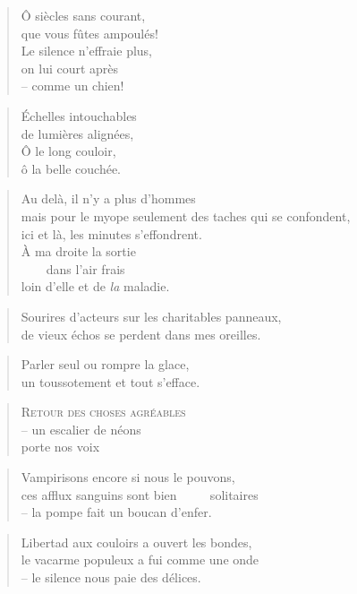   \begin{verse}
    Ô siècles sans courant,\\
    que vous fûtes ampoulés!\\
    Le silence n’effraie plus,\\
    on lui court après\\
    -- comme un chien!
  \end{verse}
  \begin{verse}
    Échelles intouchables\\
    de lumières alignées,\\
    Ô le long couloir,\\
    ô la belle couchée.
  \end{verse}
  \begin{verse}
    Au delà, il n’y a plus d’hommes\\
    mais pour le myope seulement des taches qui se confondent,\\
    ici et là, les minutes s’effondrent.\\
    À ma droite la sortie\\
    ~~~~dans l’air frais\\
    loin d’elle et de \emph{la} maladie.
  \end{verse}
  \begin{verse}
    Sourires d’acteurs sur les charitables panneaux,\\
    de vieux échos se perdent dans mes oreilles.
  \end{verse}
  \begin{verse}
    Parler seul ou rompre la glace,\\
    un toussotement et tout s’efface.
  \end{verse}
  \begin{verse}
    \textsc{Retour des choses agréables}\\
    -- un escalier de néons\\
    porte nos voix
  \end{verse}
  \begin{verse}
    Vampirisons encore si nous le pouvons,\\
    ces afflux sanguins sont bien ~~~~ solitaires\\
    -- la pompe fait un boucan d’enfer.
  \end{verse}
  \begin{verse}
    Libertad aux couloirs a ouvert les bondes,\\
    le vacarme populeux a fui comme une onde\\
    -- le silence nous paie des délices.
  \end{verse}
